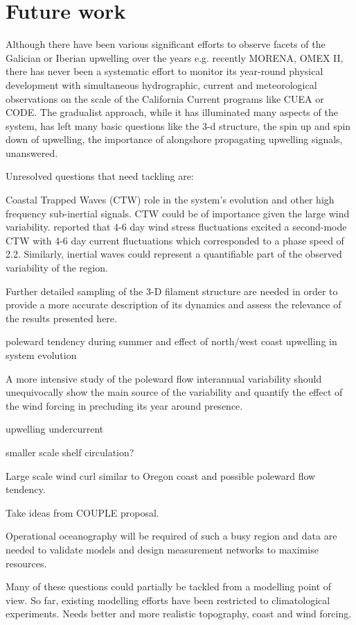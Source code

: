 \section{Future work}
Although there have been various significant efforts to observe
facets of the Galician or Iberian upwelling over the years e.g.
recently MORENA, OMEX II, there has never been a systematic effort
to monitor its year-round physical development with simultaneous
hydrographic, current and meteorological observations on the scale
of the California Current programs like CUEA or CODE. The
gradualist approach, while it has illuminated many aspects of the
system, has left many basic questions like the 3-d structure, the
spin up and spin down of upwelling, the importance of alongshore
propagating upwelling signals, unanswered.

Unresolved questions that need tackling are:

Coastal Trapped Waves (CTW) role in the system's evolution and
other high frequency sub-inertial signals. CTW could be of
importance given the large wind variability. \citet{Huthnance02}
reported that 4-6 day wind stress fluctuations excited a
second-mode CTW with 4-6 day current fluctuations which
corresponded to a phase speed of 2.2\vel. Similarly, inertial
waves could represent a quantifiable part of the observed
variability of the region.

Further detailed sampling of the 3-D filament structure are needed
in order to provide a more accurate description of its dynamics
and assess the relevance of the results presented here.

poleward tendency during summer and effect of north/west coast
upwelling in system evolution

A more intensive study of the poleward flow interannual
variability should unequivocally show the main source of the
variability and quantify the effect of the wind forcing in
precluding its year around presence.

upwelling undercurrent

smaller scale shelf circulation?

Large scale wind curl similar to Oregon coast and possible
poleward flow tendency.



Take ideas from COUPLE proposal.

Operational oceanography will be required of such a busy region
and data are needed to validate models and design measurement
networks to maximise resources.

Many of these questions could partially be tackled from a
modelling point of view. So far, existing modelling efforts have
been restricted to climatological experiments. Needs better and
more realistic topography, coast and wind forcing.
